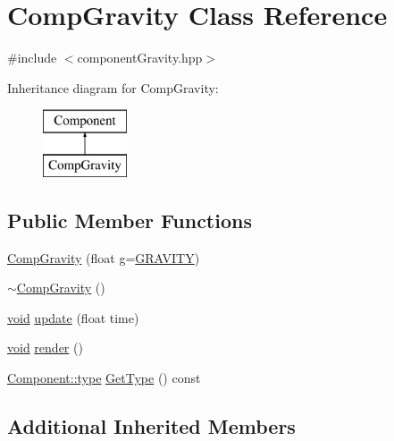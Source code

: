 \hypertarget{class_comp_gravity}{\section{Comp\-Gravity Class Reference}
\label{class_comp_gravity}
}


{\ttfamily \#include $<$component\-Gravity.\-hpp$>$}

Inheritance diagram for Comp\-Gravity\-:\begin{figure}[H]
\begin{center}
\leavevmode
\includegraphics[height=2.000000cm]{class_comp_gravity}
\end{center}
\end{figure}
\subsection*{Public Member Functions}
\begin{DoxyCompactItemize}
\item 
\hyperlink{class_comp_gravity_a694aed4a38d7c2cb904b6981a9c3757d}{Comp\-Gravity} (float \hyperlink{_s_d_l__opengl__glext_8h_acaceb3a655ff28b75259860bcb868f9f}{g}=\hyperlink{common_8hpp_a6801baa546c6112d19eb095111d24720}{G\-R\-A\-V\-I\-T\-Y})
\item 
\hyperlink{class_comp_gravity_a18128ddffcff301382dc4f84567ba582}{$\sim$\-Comp\-Gravity} ()
\item 
\hyperlink{_s_d_l__opengles2__gl2ext_8h_ae5d8fa23ad07c48bb609509eae494c95}{void} \hyperlink{class_comp_gravity_a8d229e6d5f10dd78f343e6cfb35feb42}{update} (float time)
\item 
\hyperlink{_s_d_l__opengles2__gl2ext_8h_ae5d8fa23ad07c48bb609509eae494c95}{void} \hyperlink{class_comp_gravity_a87d2f55051fe45905a21e7a98639dca0}{render} ()
\item 
\hyperlink{class_component_ad6d161b6acf7b843b55bb9feac7af71a}{Component\-::type} \hyperlink{class_comp_gravity_aa480e4c57226eb0363478f1543fc411a}{Get\-Type} () const 
\end{DoxyCompactItemize}
\subsection*{Additional Inherited Members}


